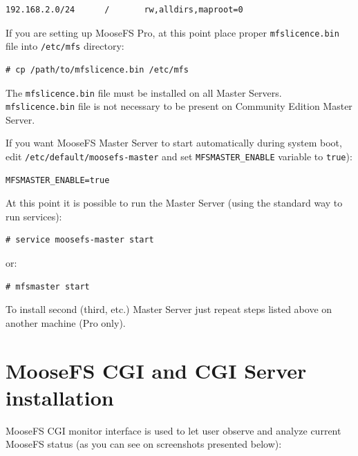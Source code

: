 \documentclass[a4paper,11pt,english]{report}
\def\code#1{\texttt{#1}}
\begin{document}
			
			\begin{lstlisting}[caption={Changes to mfsexports.cfg}]
	192.168.2.0/24		/		rw,alldirs,maproot=0
			\end{lstlisting}
			
			\bigskip
			
			If you are setting up MooseFS Pro, at this point place proper \code{mfslicence.bin} file into \code{/etc/mfs} directory:
			
			\begin{lstlisting}[caption={Instaling mfslicence.bin file}]
	# cp /path/to/mfslicence.bin /etc/mfs
			\end{lstlisting}
			
			The \code{mfslicence.bin} file must be installed on all Master Servers.\\
			\code{mfslicence.bin} file is not necessary to be present on Community Edition Master Server.
			
			If you want MooseFS Master Server to start automatically during system boot, \\
			edit \code{/etc/default/moosefs-master} and set \code{MFSMASTER\_ENABLE} variable to \code{true}):
			
			\begin{lstlisting}[caption={Configuring mfsmaster autostart}]
	MFSMASTER_ENABLE=true
			\end{lstlisting}
			
			At this point it is possible to run the Master Server (using the standard way to run services):
			
			\begin{lstlisting}[caption={Starting MooseFS Master Server}]
	# service moosefs-master start
			\end{lstlisting}
			
			or:
			
			\begin{lstlisting}[caption={Starting MooseFS Master Server}]
	# mfsmaster start
			\end{lstlisting}
			
			To install second (third, etc.) Master Server just repeat steps listed above on another machine (Pro only).
			\vfill
			
		\section{MooseFS CGI and CGI Server installation}
			MooseFS CGI monitor interface is used to let user observe and analyze current MooseFS status (as you can see on screenshots presented below): \\
			
\end{document}
